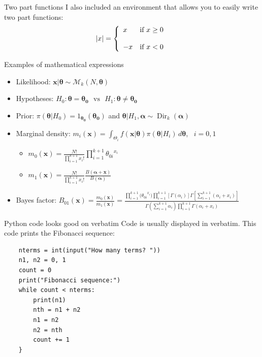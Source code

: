 
\begin{frame}{Two part functions}
	I also included an environment that allows you to easily write two part functions:
	$$|x| =\left\{ \begin{array}{ll} x & \mbox{if } x \geq 0 \\ \\ -x & \mbox{if } x < 0 \end{array} \right.$$
\end{frame}


\begin{frame}{Examples of mathematical expressions}
	\begin{itemize}
	\item Likelihood: $\bm{x}|\bm{\theta} \sim \mathcal{M}_k(N,\bm{\theta})$
	\item Hypotheses:  $ H_0: \bm{\theta}=\bm{\theta_0} \,\,\,\, \text{vs} \,\,\,\,  H_1: \bm{\theta} \neq \bm{\theta_0}$
	\item Prior: $\pi(\bm{\theta}|H_0)={1_{\bm{\theta_0}}(\bm{\theta_0})}$ and $\bm{\theta}|H_1, \bm{\alpha} \sim \operatorname{Dir}_k(\bm{\alpha})$ 
	\item Marginal density: $m_i(\bm{x})=\int_{\Theta_i} f(\bm{x}|\bm{\theta})\pi(\bm{\theta}|H_i) \, d\bm{\theta} $, \, $i=0,1$
		\begin{itemize}
		\item  $m_0(\bm{x})=\frac{N!}{\prod_{i=1}^{k+1}x_i!}\prod_{i=1}^{k+1}{\theta_{0i}}^{x_i}$ 
		\item  $m_1(\bm{x})= \frac{N!}{\prod_{i=1}^{k+1}x_i!}\frac{B(\bm{\alpha}+\bm{x})}{B(\bm{\alpha})}$ 
		\end{itemize}
	\item Bayes factor: $B_{01}(\bm{x}) = \frac{m_0(\bm{x})}{m_1(\bm{x})} = \frac{\prod_{i=1}^{k+1}{(\theta_{0i}}^{x_i}) \prod_{i=1}^{k+1}[\Gamma(\alpha_i)] \Gamma [\sum_{i=1}^{k+1}(\alpha_i+x_i)]}{\Gamma(\sum_{i=1}^{k+1} \alpha_i) \prod_{i=1}^{k+1}\Gamma(\alpha_i+x_i)}$
	\end{itemize}
\end{frame}


\begin{frame}[fragile]{Python code looks good on verbatim}
	Code is usually displayed in verbatim. This code prints the Fibonacci sequence:
	\begin{verbatim}
	nterms = int(input("How many terms? "))
	n1, n2 = 0, 1
	count = 0
	print("Fibonacci sequence:")
	while count < nterms:
	    print(n1)
	    nth = n1 + n2
	    n1 = n2
	    n2 = nth
	    count += 1
	}
	\end{verbatim}
\end{frame}

